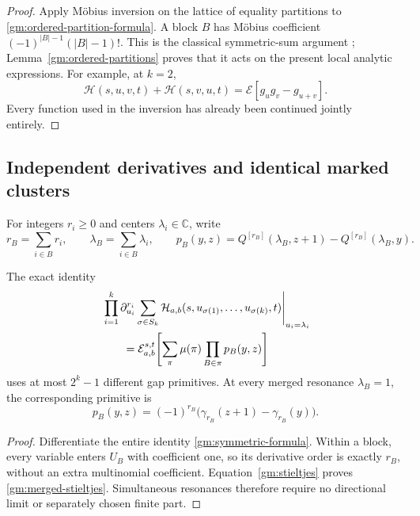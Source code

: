 \begin{proof}
Apply M\"obius inversion on the lattice of equality partitions to
\eqref{gm:ordered-partition-formula}.  A block \(B\) has M\"obius
coefficient \((-1)^{|B|-1}(|B|-1)!\).  This is the classical
symmetric-sum argument \cite{gm:Hoffman1992,gm:Hoffman2018};
Lemma~\ref{gm:ordered-partitions} proves that it acts on the present
local analytic expressions.  For example, at \(k=2\),
\[
 \mathcal H(s,u,v,t)+\mathcal H(s,v,u,t)
          =\mathcal E[g_ug_v-g_{u+v}].
\]
Every function used in the inversion has already been continued
jointly entirely.
\end{proof}

\subsection{Independent derivatives and identical marked clusters}

For integers \(r_i\ge0\) and centers \(\lambda_i\in\mathbb C\),
write
\[
 r_B=\sum_{i\in B}r_i,\qquad
 \lambda_B=\sum_{i\in B}\lambda_i,\qquad
 p_B(y,z)=Q^{[r_B]}(\lambda_B,z+1)
                              -Q^{[r_B]}(\lambda_B,y).
\]

\begin{corollary}
\label{gm:marked}
The exact identity
\begin{align}\label{gm:marked-formula}
 &\left.\prod_{i=1}^k\partial_{u_i}^{r_i}
    \sum_{\sigma\in S_k}
      \mathcal H_{a,b}(s,u_{\sigma(1)},\ldots,u_{\sigma(k)},t)
                       \right|_{u_i=\lambda_i}\notag\\
 &\qquad=\mathcal E_{a,b}^{s,t}\!\left[
               \sum_\pi\mu(\pi)\prod_{B\in\pi}p_B(y,z)\right]
\end{align}
uses at most \(2^k-1\) different gap primitives.  At every merged
resonance \(\lambda_B=1\), the corresponding primitive is
\begin{equation}\label{gm:merged-stieltjes}
 p_B(y,z)=(-1)^{r_B}
                  \bigl(\gamma_{r_B}(z+1)-\gamma_{r_B}(y)\bigr).
\end{equation}
\end{corollary}

\begin{proof}
Differentiate the entire identity \eqref{gm:symmetric-formula}.
Within a block, every variable enters \(U_B\) with coefficient one,
so its derivative order is exactly \(r_B\), without an extra
multinomial coefficient.  Equation~\eqref{gm:stieltjes} proves
\eqref{gm:merged-stieltjes}.  Simultaneous resonances therefore require
no directional limit or separately chosen finite part.
\end{proof}

